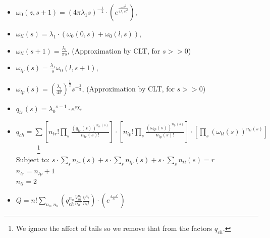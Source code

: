 \documentclass[10pt,letterpaper]{article}
\begin{document}
		\begin{itemize}
			\item $\omega_0(z,s+1)=(4\pi\lambda_1s)^{-\frac{1}{2}} \cdot(e^{\frac{-z^2}{4\lambda_1 s l^2}})$,
			\item $\omega_{tl}(s)=\lambda_1 \cdot(\omega_0(0,s)+\omega_0(l,s))$,
			\item $\omega_{tl}(s+1)=\frac{\lambda_1}{\pi s}$,  (Approximation by CLT, for $s>>0$) 
			\item $\omega_{lp}(s)=\frac{\lambda_1}{s}\omega_0(l,s+1)$,  
			\item $\omega_{lp}(s)=\left(\frac{\lambda_1}{4\pi}\right)^{\frac{1}{2}}s^{-\frac{3}{2}}$, (Approximation by CLT, for $s>>0$) 
			\item $q_{tr}(s)={\lambda_0}^{s-1}\cdot e^{s\chi_s}$
			\item$\displaystyle q_{ch}=\sum \left[n_{tr}!\prod_{s}\frac{\left(q_{tr}(s)\right)^{n_{tr}(s)}}{n_{tr}(s)!}\right]\cdot\left[n_{lp}!\prod_{s}\frac{\left(\omega_{lp}(s)\right)^{n_{lp}(s)}}{n_{lp}(s)!}\right]\cdot\left[\prod_{s}\left(\omega_{tl}(s)\right)^{n_{tl}(s)}\right]$~~~~~~\footnote{We ignore the affect of tails so we remove that from the factors $q_{ch}$.}\\
			 $\displaystyle\text{Subject to:  } s\cdot \sum_{s} n_{tr}(s)+s\cdot \sum_{s} n_{lp}(s)+s \cdot \sum_{s} n_{tl}(s)=r$\\
			 $n_{tr}=n_{lp}+1$\\
			 $n_{tl}=2$
			\item $\displaystyle Q=n!\sum_{n_a,n_b}\left(q_{ch}^{n_{a}}\frac{V_{m}^{n_{a}}}{n_a!}\frac{V^{n_{b}}}{n_b!}\right)\cdot \left(e^{^{\frac{A-A^{*}}{kT}}}\right)$
		\end{itemize}
\end{document}
